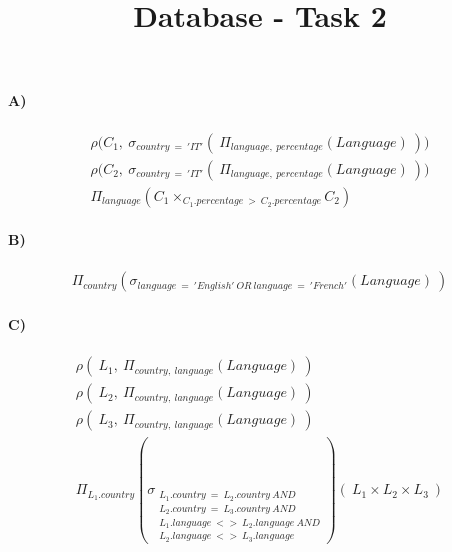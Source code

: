 \documentclass[a4paper,12pt]{article}
\title{Database - Task 2}				%
\date{}									%
\begin{document}

	\paragraph{A)}
	\begin{align*}
		\rho({C_{1},\ \sigma_{country\ =\ 'IT'}(\ \Pi_{language,\ percentage}(Language)\ )) }\\
		\rho({C_{2},\ \sigma_{country\ =\ 'IT'}(\ \Pi_{language,\ percentage}(Language)\ )) }\\
		\Pi_{language}(C_{1} \times_{C_{1}.percentage\ >\ C_{2}.percentage} C_{2})
	\end{align*}
	\newline{}

	\paragraph{B)}
	\begin{align*}
		\Pi_{country}( \sigma_{language\ =\ 'English'\ OR\ language\ =\ 'French'}(Language)\ )
	\end{align*}
	\newline{}

	\paragraph{C)}
	\begin{align*}
		\rho(\ L_{1},\ \Pi_{country,\ language}(Language)\ ) \\
		\rho(\ L_{2},\ \Pi_{country,\ language}(Language)\ ) \\
		\rho(\ L_{3},\ \Pi_{country,\ language}(Language)\ ) \\
		\Pi_{L_{1}.country}(
			\sigma_{ \substack{L_{1}.country\ =\ L_{2}.country\ AND\\
							   L_{2}.country\ =\ L_{3}.country\ AND\\
							   L_{1}.language\ <>\ L_{2}.language\ AND\\
							   L_{2}.language\ <>\ L_{3}.language
			         }
			}
		)(\ L_{1} \times L_{2} \times L_{3}\ )
	\end{align*}
	\newline{}
\end{document}
